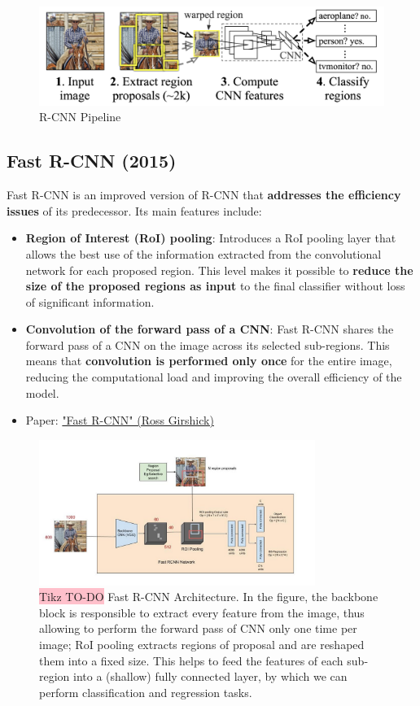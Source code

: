\begin{figure}[!htbp]
    \centering
    \includegraphics[width=0.9\linewidth]{tikz/chapter5 - R-CNN.png}
    \caption{R-CNN Pipeline}
\end{figure}

\subsection{Fast R-CNN (2015)}
Fast R-CNN is an improved version of R-CNN that \textbf{addresses the efficiency issues} of its predecessor. Its main features include:

\begin{itemize}
    \item \textbf{Region of Interest (RoI) pooling}: Introduces a RoI pooling layer that allows the best use of the information extracted from the convolutional network for each proposed region. This level makes it possible to \textbf{reduce the size of the proposed regions as input} to the final classifier without loss of significant information.
    \item \textbf{Convolution of the forward pass of a CNN}: Fast R-CNN shares the forward pass of a CNN on the image across its selected sub-regions. This means that \textbf{convolution is performed only once} for the entire image, reducing the computational load and improving the overall efficiency of the model.
    \item Paper: \href{https://arxiv.org/pdf/1504.08083.pdf}{"Fast R-CNN" (Ross Girshick)}
\end{itemize}

\begin{figure}[!htbp]
    \centering
    \includegraphics[width=0.8\textwidth]{tikz/chapter5 - Fast R-CNN.jpeg}
    \caption{{\color{red}\colorbox{pink}{Tikz TO-DO}} Fast R-CNN Architecture. In the figure, the backbone block is responsible to extract every feature from the image, thus allowing to perform the forward pass of CNN only one time per image; RoI pooling extracts regions of proposal and are reshaped them into a fixed size. This helps to feed the features of each sub-region into a (shallow) fully connected layer,  by which we can perform classification and regression tasks.   }
\end{figure}


